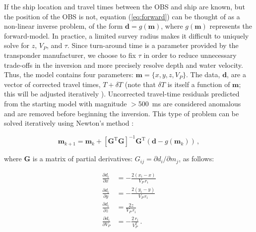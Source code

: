 \documentclass[10pt,titlepage]{article}
\providecommand{\DIFaddtex}[1]{{\protect\color{blue}\uwave{#1}}} %
\providecommand{\DIFaddbegin}{} %
\providecommand{\DIFaddend}{} %
\providecommand{\DIFadd}[1]{\texorpdfstring{\DIFaddtex{#1}}{#1}} %
\begin{document}
If the ship location and travel times between the OBS and ship are known, but the position of the OBS is not, equation (\ref{eq:forward}) can be thought of as a non-linear inverse problem, of the form $ \mathbf{d} = g(\mathbf{m})$, where $g(\mathbf{m})$ represents the forward-model. In practice, a limited survey radius makes it difficult to uniquely solve for $z$, $V_P$, and $\tau$. Since turn-around time is a parameter provided by the transponder manufacturer, we choose to fix $\tau$ in order to reduce unnecessary trade-offs in the inversion and more precisely resolve depth and water velocity. Thus, the model contains four parameters: $\mathbf{m} = \{x,y,z,V_P\}$. The data, $\mathbf{d}$, are a vector of corrected travel times, $T+\delta T$ (note that $\delta T$ is itself a function of $\mathbf{m}$; this will be adjusted iteratively \DIFaddbegin \DIFadd{during the inversion}\DIFaddend ). Uncorrected travel-time residuals predicted from the starting model with magnitude $>$500~ms are considered anomalous and are removed before beginning the inversion. This type of problem can be solved iteratively using Newton's method \citep{Menke2018}:

\begin{equation}
	\mathbf{m}_{k+1} = \mathbf{m}_k + \left[\mathbf{G}^{\text{T}} \mathbf{G}\right]^{-1} \mathbf{G}^{\text{T}} \left(\mathbf{d} - g(\mathbf{m}_k)\right) \,,
\end{equation}

where $\mathbf{G}$ is a matrix of partial derivatives: $G_{ij} = \partial d_i/\partial m_j$, as follows:

\begin{align}
\frac{\partial d_i}{\partial x} &= 
	-\frac{2 (x_i - x)}{V_P \, r_i}\\
\frac{\partial d_i}{\partial y} &= 
	-\frac{2 (y_i - y)}{V_P \, r_i} \\
\frac{\partial d_i}{\partial z} &= 
	\frac{2 z}{V_P \, r_i} \\	
\frac{\partial d_i}{\partial V_P} &= 
	-\frac{2 \, r_i}{V_P^2} \,.
\end{align}
\end{document}
